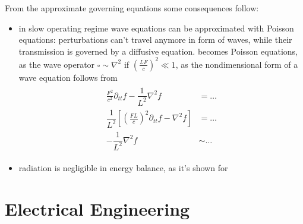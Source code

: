 \documentclass[letterpaper,10pt,english]{jupyterBook}
\begin{document}
\sphinxAtStartPar
{} 

\sphinxAtStartPar
From the approximate governing equations some consequences follow:
\begin{itemize}
\item {} 
\sphinxAtStartPar
in slow operating regime wave equations can be approximated with Poisson equations: perturbations can’t travel anymore in form of waves, while their transmission is governed by a diffusive equation.
{\hyperref[\detokenize{ch/waves-equation:classical-electromagnetism-waves-wave-equation}]{}} becomes Poisson equations, as the wave operator \(\square \sim \nabla^2\) if \(\left( \frac{L F}{c} \right)^2 \ll 1\), as the non\sphinxhyphen{}dimensional form of a wave equation follows from
\begin{equation*}
\begin{split}\begin{aligned}
      \frac{F^2}{c^2} \partial_{tt} f - \dfrac{1}{L^2} \nabla^2 f & = \dots \\
      \dfrac{1}{L^2} \left[ \left( \frac{F L}{c}\right)^2 \partial_{tt} f -  \nabla^2 f \right] & = \dots \\
     - \dfrac{1}{L^2} \nabla^2 f  & \sim \dots 
    \end{aligned}\end{split}
\end{equation*}
\item {} 
\sphinxAtStartPar
radiation is negligible in energy balance, as it’s shown for {\hyperref[\detokenize{ch/circuits-energy:classical-electromagnetism-circuits-energy-boundary}]{}}

\end{itemize}



\sphinxstepscope


\part{Electrical Engineering}
\end{document}
